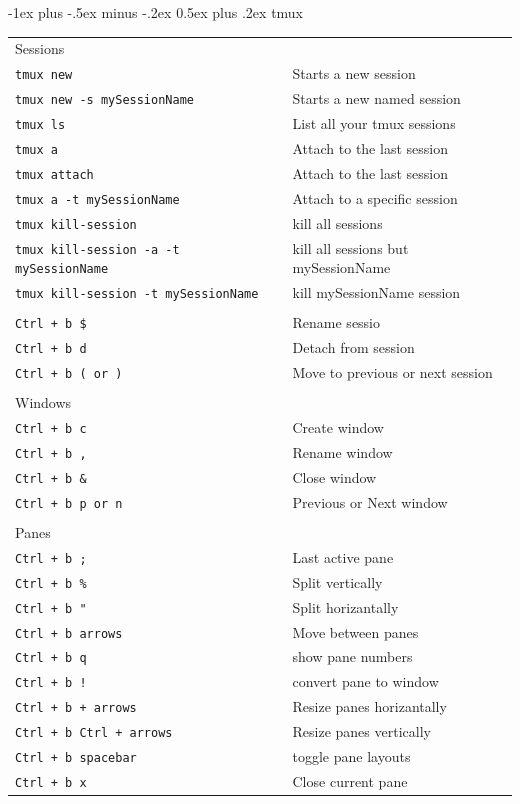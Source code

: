 \documentclass[10pt,landscape]{article}
\makeatletter
\renewcommand{\section}{\@startsection{section}{1}{0mm}%
                                {-1ex plus -.5ex minus -.2ex}%
                                {0.5ex plus .2ex}%
                                {\normalfont\large\bfseries}}
\makeatother
\begin{document}
\begin{multicols}{2}
\section{tmux}

\begin{tabular}{@{}ll@{}}
Sessions \\
\texttt{tmux new} & Starts a new session \\
\texttt{tmux new -s mySessionName} & Starts a new named session \\
\texttt{tmux ls} & List all your tmux sessions \\
\texttt{tmux a} &  Attach to the last session \\
\texttt{tmux attach} &  Attach to the last session \\
\texttt{tmux a -t mySessionName } & Attach to a specific session  \\
\texttt{tmux kill-session} & kill all sessions \\
\texttt{tmux kill-session -a -t mySessionName } & kill all sessions but mySessionName \\
\texttt{tmux kill-session -t mySessionName } &  kill mySessionName session\\
\\
\texttt{Ctrl + b \$ } &  Rename sessio \\
\texttt{Ctrl + b d } & Detach from session \\
\texttt{Ctrl + b ( or ) } & Move to previous or next session \\

\\ Windows \\
\texttt{Ctrl + b  c } & Create window \\
\texttt{Ctrl + b  , } & Rename window \\
\texttt{Ctrl + b  \& } & Close window \\
\texttt{Ctrl + b  p or n } & Previous or Next window \\

\\ Panes \\
\texttt{Ctrl + b  ; } & Last active pane\\
\texttt{Ctrl + b  \% } & Split vertically \\
\texttt{Ctrl + b  " } & Split horizantally \\
\texttt{Ctrl + b arrows }  & Move between panes \\
\texttt{Ctrl + b q } & show pane numbers \\
\texttt{Ctrl + b ! } & convert pane to window  \\
\texttt{Ctrl + b + arrows }  & Resize panes horizantally \\
\texttt{Ctrl + b Ctrl + arrows }  & Resize panes vertically \\
\texttt{Ctrl + b spacebar }  & toggle pane layouts \\
\texttt{Ctrl + b x}  & Close current pane


\end{tabular}
\end{multicols}
\end{document}
